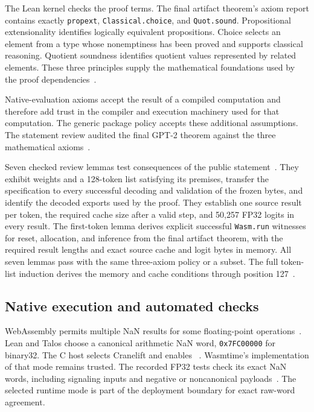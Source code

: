 \documentclass[11pt]{article}
\newcommand{\code}[1]{\texttt{#1}}
\newcommand{\longcode}[1]{\texttt{\seqsplit{#1}}}
\begin{document}
The Lean kernel checks the proof terms.  The final artifact theorem's axiom report contains exactly \code{propext}, \code{Classical.choice}, and \code{Quot.sound}.  Propositional extensionality identifies logically equivalent propositions.  Choice selects an element from a type whose nonemptiness has been proved and supports classical reasoning.  Quotient soundness identifies quotient values represented by related elements.  These three principles supply the mathematical foundations used by the proof dependencies~\cite{leanaxioms,review}.

Native-evaluation axioms accept the result of a compiled computation and therefore add trust in the compiler and execution machinery used for that computation.  The generic package policy accepts these additional assumptions.  The statement review audited the final GPT-2 theorem against the three mathematical axioms~\cite{artifactgate,review}.

Seven checked review lemmas test consequences of the public statement~\cite{reviewlemmas}.  They exhibit weights and a 128-token list satisfying its premises, transfer the specification to every successful decoding and validation of the frozen bytes, and identify the decoded exports used by the proof.  They establish one source result per token, the required cache size after a valid step, and 50,257 FP32 logits in every result.  The first-token lemma derives explicit successful \code{Wasm.run} witnesses for reset, allocation, and inference from the final artifact theorem, with the required result lengths and exact source cache and logit bytes in memory.  All seven lemmas pass with the same three-axiom policy or a subset.  The full token-list induction derives the memory and cache conditions through position 127~\cite{session,reviewlemmas}.

\subsection{Native execution and automated checks}

WebAssembly permits multiple NaN results for some floating-point operations~\cite{wasmspec}.  Lean and Talos choose a canonical arithmetic NaN word, \code{0x7FC00000} for binary32.  The C host selects Cranelift and enables \longcode{wasmtime\_config\_cranelift\_nan\_canonicalization\_set}~\cite{wasmtime,driver}.  Wasmtime's implementation of that mode remains trusted.  The recorded FP32 tests check its exact NaN words, including signaling inputs and negative or noncanonical payloads~\cite{tests}.  The selected runtime mode is part of the deployment boundary for exact raw-word agreement.
\end{document}
